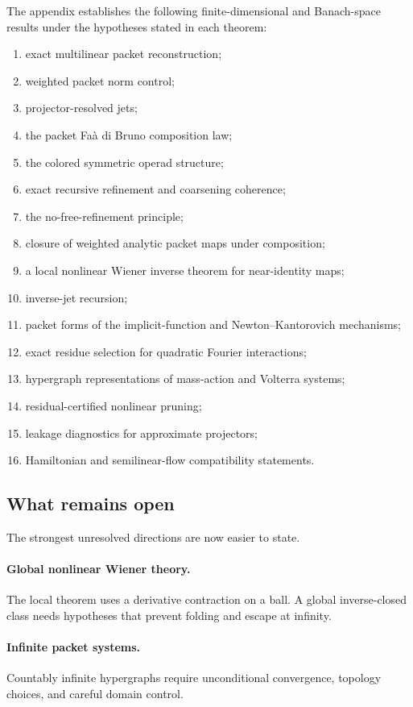 \documentclass[11pt]{article}
\theoremstyle{definition}
\theoremstyle{remark}
\begin{document}
The appendix establishes the following finite-dimensional and Banach-space results under the hypotheses stated in each theorem:
\begin{enumerate}[label=(\arabic*)]
\item exact multilinear packet reconstruction;
\item weighted packet norm control;
\item projector-resolved jets;
\item the packet Fa\`a di Bruno composition law;
\item the colored symmetric operad structure;
\item exact recursive refinement and coarsening coherence;
\item the no-free-refinement principle;
\item closure of weighted analytic packet maps under composition;
\item a local nonlinear Wiener inverse theorem for near-identity maps;
\item inverse-jet recursion;
\item packet forms of the implicit-function and Newton--Kantorovich mechanisms;
\item exact residue selection for quadratic Fourier interactions;
\item hypergraph representations of mass-action and Volterra systems;
\item residual-certified nonlinear pruning;
\item leakage diagnostics for approximate projectors;
\item Hamiltonian and semilinear-flow compatibility statements.
\end{enumerate}

\subsection{What remains open}

The strongest unresolved directions are now easier to state.

\paragraph{Global nonlinear Wiener theory.}
The local theorem uses a derivative contraction on a ball.  A global inverse-closed class needs hypotheses that prevent folding and escape at infinity.

\paragraph{Infinite packet systems.}
Countably infinite hypergraphs require unconditional convergence, topology choices, and careful domain control.
\end{document}
